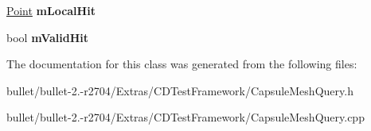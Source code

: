 \begin{DoxyCompactItemize}
\item 
\hypertarget{class_capsule_mesh_query_a48fa4e90020c80952a784edadf3a282f}{\hyperlink{class_point}{Point} {\bfseries m\+Local\+Hit}}\label{class_capsule_mesh_query_a48fa4e90020c80952a784edadf3a282f}

\item 
\hypertarget{class_capsule_mesh_query_addfebbaae01db1a08f37330ae002caa2}{bool {\bfseries m\+Valid\+Hit}}\label{class_capsule_mesh_query_addfebbaae01db1a08f37330ae002caa2}

\end{DoxyCompactItemize}


The documentation for this class was generated from the following files\+:\begin{DoxyCompactItemize}
\item 
bullet/bullet-\/2.-\/r2704/\+Extras/\+C\+D\+Test\+Framework/Capsule\+Mesh\+Query.\+h\item 
bullet/bullet-\/2.-\/r2704/\+Extras/\+C\+D\+Test\+Framework/Capsule\+Mesh\+Query.\+cpp\end{DoxyCompactItemize}
